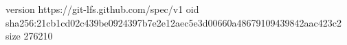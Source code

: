 version https://git-lfs.github.com/spec/v1
oid sha256:21cb1cd02c439be0924397b7e2e12aec5e3d00660a48679109439842aac423c2
size 276210
